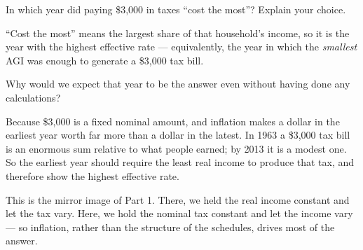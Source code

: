 \documentclass[12pt]{ximera}
\begin{document}
\begin{problem}
In which year did paying \$3,000 in taxes ``cost the most''? Explain your choice.

\begin{freeResponse}
\end{freeResponse}

\begin{solution}
``Cost the most'' means the largest share of that household's income, so it is the year
with the highest effective rate --- equivalently, the year in which the \emph{smallest}
AGI was enough to generate a \$3,000 tax bill.
\end{solution}
\end{problem}

\begin{problem}
Why would we expect that year to be the answer even without having done any
calculations?

\begin{freeResponse}
\end{freeResponse}

\begin{solution}
Because \$3,000 is a fixed nominal amount, and inflation makes a dollar in the earliest
year worth far more than a dollar in the latest. In 1963 a \$3,000 tax bill is an
enormous sum relative to what people earned; by 2013 it is a modest one. So the earliest
year should require the least real income to produce that tax, and therefore show the
highest effective rate.

This is the mirror image of Part 1. There, we held the real income constant and let the
tax vary. Here, we hold the nominal tax constant and let the income vary --- so
inflation, rather than the structure of the schedules, drives most of the answer.
\end{solution}
\end{problem}
\end{document}
